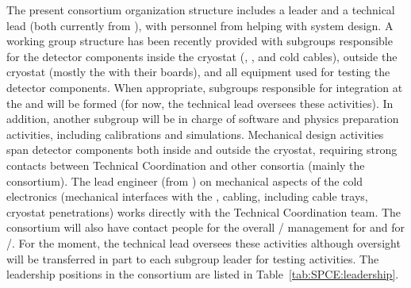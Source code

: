 The present consortium organization
structure includes a leader and a technical lead (both currently
from ), with personnel from  helping with system design. A working group structure has been recently 
provided with subgroups responsible for the detector 
components inside the cryostat (, , and
cold cables), outside the cryostat (mostly the  with 
their boards), and all equipment
used for testing the detector components. When appropriate, subgroups
responsible for integration at the  and
 will be formed (for now, the technical lead oversees 
these activities). In addition,
another subgroup will be in charge of software and physics
preparation activities, including calibrations and simulations.
Mechanical design activities span detector components both inside
and outside the cryostat, requiring strong contacts between 
Technical Coordination and other consortia (mainly the 
consortium). The lead engineer (from ) on mechanical aspects of the cold
electronics (mechanical interfaces with the , cabling, including 
cable trays, cryostat penetrations) works directly with
the Technical Coordination team. The  consortium will also have 
contact people for the overall / management for
 and for /. For the moment, the technical lead oversees these activities although oversight
will be transferred in part to each subgroup leader for testing
activities. The leadership positions in the consortium 
are listed in Table~\ref{tab:SPCE:leadership}.

